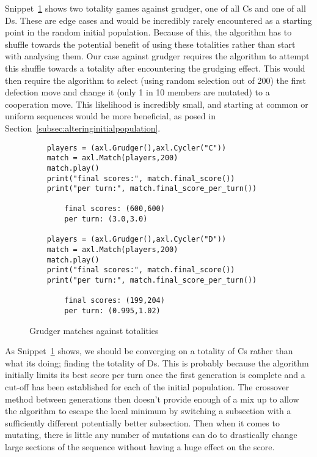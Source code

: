 Snippet~\ref{code:gudgerTotailites} shows two totality games against grudger, one of all Cs and one of all Ds.
These are edge cases and would be incredibly rarely encountered as a starting point in the random initial population.
Because of this, the algorithm has to shuffle towards the potential benefit of using these totalities rather than start with analysing them.
Our case against grudger requires the algorithm to attempt this shuffle towards a totality after encountering the grudging effect.
This would then require the algorithm to select (using random selection out of 200) the first defection move and change it (only 1 in 10 members are mutated) to a cooperation move.
This likelihood is incredibly small, and starting at common or uniform sequences would be more beneficial, as posed in Section~\ref{subsec:alteringinitialpopulation}.\\

\begin{figure}[ht] 
    \begin{verbatim}
    players = (axl.Grudger(),axl.Cycler("C"))
    match = axl.Match(players,200)
    match.play()
    print("final scores:", match.final_score())
    print("per turn:", match.final_score_per_turn())

        final scores: (600,600)
        per turn: (3.0,3.0)

    players = (axl.Grudger(),axl.Cycler("D"))
    match = axl.Match(players,200)
    match.play()
    print("final scores:", match.final_score())
    print("per turn:", match.final_score_per_turn())

        final scores: (199,204)
        per turn: (0.995,1.02)
    \end{verbatim}
    \caption{Grudger matches against totalities}\label{code:gudgerTotailites}
\end{figure}

As Snippet~\ref{code:gudgerTotailites} shows, we should be converging on a totality of Cs rather than what its doing;
finding the totality of Ds.
This is probably because the algorithm initially limits its best score per turn once the first generation is complete and a cut-off has been established for each of the initial population.
The crossover method between generations then doesn't provide enough of a mix up to allow the algorithm to escape the local minimum by switching a subsection with a sufficiently different potentially better subsection.
Then when it comes to mutating, there is little any number of mutations can do to drastically change large sections of the sequence without having a huge effect on the score.\\

